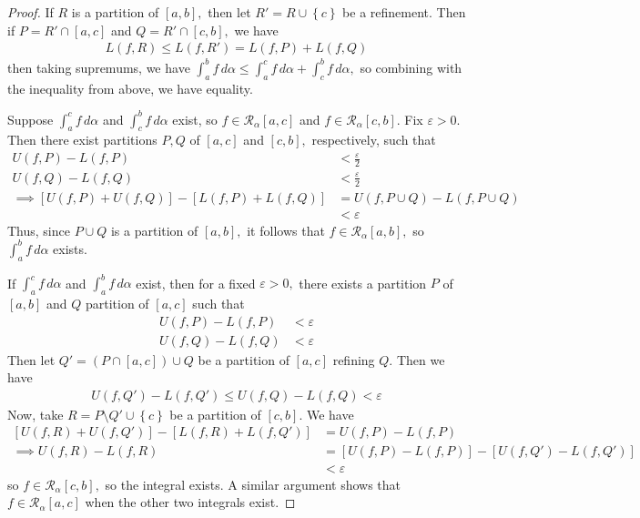 \documentclass{article}
\begin{document}
\begin{itemize}
\begin{proof}
			If $R$ is a partition of $[a, b],$ then let $R'=R\cup\left\{ c \right\}$ be a refinement. Then if $P=R'\cap [a, c]$ and $Q=R'\cap [c, b],$ we have
			\begin{align*}
				L(f, R)\le L(f, R') = L(f, P) + L(f, Q)
			\end{align*}
			then taking supremums, we have $\int_a^b f\, d\alpha \le \int_a^c f\, d\alpha + \int_c^b f\, d\alpha,$ so combining with the inequality from above, we have equality.

			Suppose $\int_a^c f\, d\alpha$ and $\int_c^b f\, d\alpha$ exist, so $f\in \mathcal R_\alpha[a, c]$ and $f\in \mathcal R_\alpha[c, b].$ Fix $\varepsilon>0.$ Then there exist partitions $P, Q$ of $[a, c]$ and $[c, b],$ respectively, such that
			\begin{align*}
				U(f, P)-L(f, P) &< \frac{\varepsilon}{2} \\
				U(f, Q)-L(f, Q) &< \frac{\varepsilon}{2} \\
				\implies \left[ U(f, P) + U(f, Q) \right] - \left[ L(f, P) + L(f, Q) \right] &= U(f, P\cup Q) - L(f, P\cup Q) \\
				&< \varepsilon
			\end{align*}
			Thus, since $P\cup Q$ is a partition of $[a, b],$ it follows that $f\in\mathcal R_\alpha[a, b],$ so $\int_a^b f\, d\alpha$ exists.

			If $\int_a^c f\, d\alpha$ and $\int_a^b f\, d\alpha$ exist, then for a fixed $\varepsilon>0,$ there exists a partition $P$ of $[a, b]$ and $Q$ partition of $[a, c]$ such that
			\begin{align*}
				U(f, P)-L(f, P) &< \varepsilon \\
				U(f, Q)-L(f, Q) &< \varepsilon
			\end{align*}
			Then let $Q'=(P\cap [a, c])\cup Q$ be a partition of $[a, c]$ refining $Q.$ Then we have
			\begin{align*}
				U(f, Q')-L(f, Q')\le U(f, Q)-L(f, Q) < \varepsilon
			\end{align*}
			Now, take $R=P\setminus Q' \cup \left\{ c \right\}$ be a partition of $[c, b].$ We have
			\begin{align*}
				\left[ U(f, R) + U(f, Q') \right] - \left[ L(f, R) + L(f, Q') \right] &= U(f, P) - L(f, P) \\
				\implies U(f, R) - L(f, R) &= \left[ U(f, P) - L(f, P) \right] - \left[ U(f, Q') - L(f, Q') \right] \\
				&<\varepsilon
			\end{align*}
			so $f\in\mathcal R_\alpha[c, b],$ so the integral exists. A similar argument shows that $f\in\mathcal R_\alpha[a, c]$ when the other two integrals exist.
		\end{proof}


\end{itemize}
\end{document}
